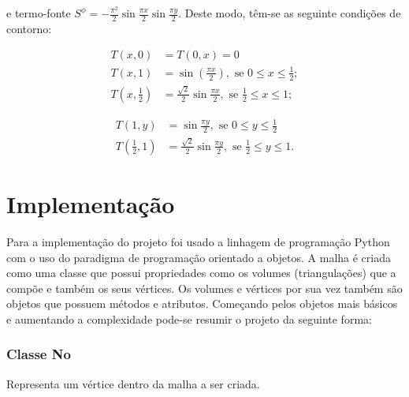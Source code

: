e termo-fonte $S^\phi = -\frac{\pi^2}{2}\sin{\frac{\pi x}{2}}\sin{\frac{\pi y}{2}}$. Deste modo, têm-se as seguinte condições de contorno:

\begin{equation*}
\begin{split}
    T(x,0)&=T(0,x)=0\\
    T(x,1)&=\sin(\frac{\pi x}{2}), \text{ se } 0 \leq x \leq \frac{1}{2};\\
    T(x,\frac{1}{2})&=\frac{\sqrt{2}}{2} \sin{\frac{\pi x}{2}}, \text{ se } \frac{1}{2} \leq x \leq 1;
\end{split}
\end{equation*}

\begin{equation*}
\begin{split}
    T(1,y)&=\sin{\frac{\pi y}{2}}, \text{ se } 0 \leq y \leq \frac{1}{2}\\
    T(\frac{1}{2},1)&=\frac{\sqrt{2}}{2}\sin{\frac{\pi y}{2}}, \text{ se } \frac{1}{2} \leq y \leq 1.
\end{split}
\end{equation*}
    
\section{Implementação}
Para a implementação do projeto foi usado a linhagem de programação Python com o uso do paradigma de programação orientado a objetos. A malha é criada como uma classe que possui propriedades como os volumes (triangulações) que a compõe e também os seus vértices. Os volumes e vértices por sua vez também são objetos que possuem métodos e atributos. Começando pelos objetos mais básicos e aumentando a complexidade pode-se resumir o projeto da seguinte forma:


\subsubsection{Classe No}
Representa um vértice dentro da malha a ser criada.

